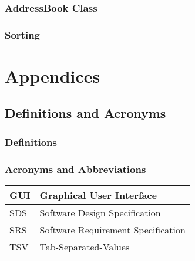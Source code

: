 \documentclass[a4paper, 11pt]{article}
\begin{document}
\subsubsection{AddressBook Class}





\subsubsection{Sorting}









\section{Appendices}

\subsection{Definitions and Acronyms}
\subsubsection{Definitions}
\subsubsection{Acronyms and Abbreviations}

	\begin{tabular}{ | m{1cm} | m{10cm} | } 
		\hline
		GUI & Graphical User Interface \\
		\hline
		SDS & Software Design Specification \\
		\hline
		SRS & Software Requirement Specification  \\
		\hline
		TSV & Tab-Separated-Values \\
		\hline
	\end{tabular}
\end{document}
